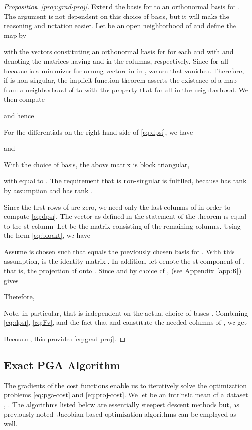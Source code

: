 \documentclass[final]{svjour3}
\newcommand{\lemref}[1]{\text{Lemma~\ref{lem:#1}}}
\begin{document}
\begin{proof}[Proposition~\ref{prop:grad-proj}]
Extend the basis
 for  to an orthonormal basis for 
. The argument is not dependent on this choice of basis, but it will 
make the reasoning and notation easier. Let  be an open neighborhood of  and
define the map  by

with the vectors  constituting an orthonormal basis for
 for each  and with  and  denoting the matrices having 
and  in the columns, respectively. 
Since  for all
 because  is a minimizer for  among
vectors in in , we see that 
 vanishes. Therefore, if  is 
non-singular, the implicit function theorem asserts the existence of a map  
from a neighborhood 
of  to  with the property that  for all  in
the neighborhood. We then compute

and hence

For the differentials on the right hand side of \eqref{eq:dpsi}, we have

 and

With the choice of basis, the above matrix is block triangular,

with  equal to .  The
requirement that  is non-singular is 
fulfilled, because  has rank  by assumption
and  has rank .

Since the first  rows of  are zero, we need only 
the last  columns of  in order to
compute \eqref{eq:dpsi}. The vector  as defined in
the statement of the theorem is equal to the st column. 
Let  be the matrix consisting of the remaining  
columns. Using the form \eqref{eq:blockt}, we have


Assume  is chosen such that 
equals the previously chosen basis for . With this assumption,
 is the identity matrix .
In addition, let  denote the st component of , 
that is, the projection of
 onto . Since  and
by choice of , \lemref{orth-deriv} (see Appendix~\ref{app:B}) gives

Therefore,

Note, in particular, that  is independent
on the actual choice of bases . Combining \eqref{eq:dpsi}, \eqref{eq:Fv},
and the fact that
 and  constitute the needed
columns of , we get 

Because , this provides \eqref{eq:grad-proj}.

\end{proof}

\subsection{Exact PGA Algorithm}
The gradients of the cost functions enable us to 
iteratively solve the optimization problems
\eqref{eq:pga-cost} and \eqref{eq:proj-cost}.
We let  be an intrinsic mean of a dataset , 
.
The algorithms listed below are essentially steepest descent methods but,
as previously noted, Jacobian-based optimization algorithms can be employed as well.
\end{document}
